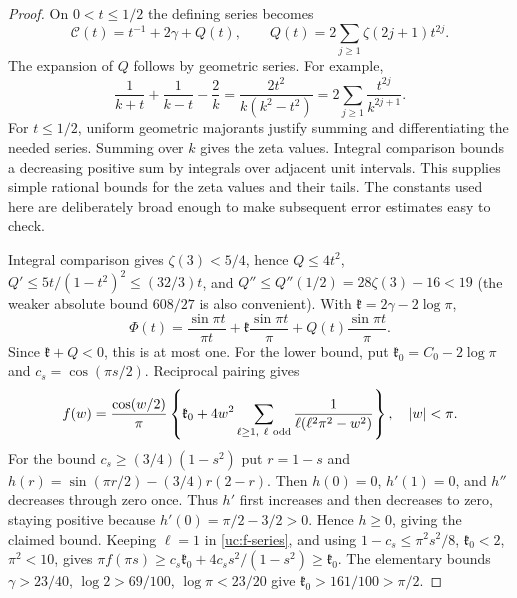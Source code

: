 \begin{proof}
On $0<t\leq1/2$ the defining series becomes
\[
 \mathcal C(t)=t^{-1}+2\gamma+Q(t),\qquad
 Q(t)=2\sum_{j\geq1}\zeta(2j+1)t^{2j}.
\]
The expansion of $Q$ follows by geometric series. For example,
\[
 \frac1{k+t}+\frac1{k-t}-\frac2k
 =\frac{2t^2}{k(k^2-t^2)}
 =2\sum_{j\geq1}\frac{t^{2j}}{k^{2j+1}}.
\]
For $t\leq1/2$, uniform geometric majorants justify summing and
differentiating the needed series. Summing over $k$ gives the zeta
values. Integral comparison bounds a decreasing positive sum by
integrals over adjacent unit intervals. This supplies simple rational
bounds for the zeta values and their tails. The constants used here
are deliberately broad enough to make subsequent error estimates easy
to check.

Integral comparison gives $\zeta(3)<5/4$, hence
$Q\leq4t^2$, $Q'\leq5t/(1-t^2)^2\leq(32/3)t$, and
$Q''\leq Q''(1/2)=28\zeta(3)-16<19$
(the weaker absolute bound $608/27$ is also convenient).
With $\mathfrak{k}=2\gamma-2\log\pi$,
\[
 \Phi(t)=\frac{\sin\pi t}{\pi t}
             +\mathfrak{k}\frac{\sin\pi t}\pi+Q(t)\frac{\sin\pi t}\pi.
\]
Since $\mathfrak{k}+Q<0$, this is at most one. For the lower bound, put
$\mathfrak{k}_0=C_0-2\log\pi$ and $c_s=\cos(\pi s/2)$. Reciprocal pairing gives
\begin{equation}\label{uc:f-series}
 f(w)=\frac{\cos(w/2)}\pi
 \left\{\mathfrak{k}_0+4w^2\sum_{\ell\geq1,\ \ell\ {\rm odd}}
       \frac1{\ell(\ell^2\pi^2-w^2)}\right\},\quad |w|<\pi.
\end{equation}
For the bound $c_s\geq(3/4)(1-s^2)$ put $r=1-s$ and
$h(r)=\sin(\pi r/2)-(3/4)r(2-r)$. Then $h(0)=0$, $h'(1)=0$,
and $h''$ decreases through zero once. Thus $h'$ first increases
and then decreases to zero, staying positive because
$h'(0)=\pi/2-3/2>0$. Hence $h\geq0$, giving the claimed bound. Keeping
$\ell=1$ in \eqref{uc:f-series}, and using
$1-c_s\leq\pi^2s^2/8$, $\mathfrak{k}_0<2$, $\pi^2<10$, gives
$\pi f(\pi s)\geq c_s\mathfrak{k}_0+4c_ss^2/(1-s^2)\geq \mathfrak{k}_0$.
The elementary bounds $\gamma>23/40$, $\log2>69/100$,
$\log\pi<23/20$ give $\mathfrak{k}_0>161/100>\pi/2$.


\end{proof}
